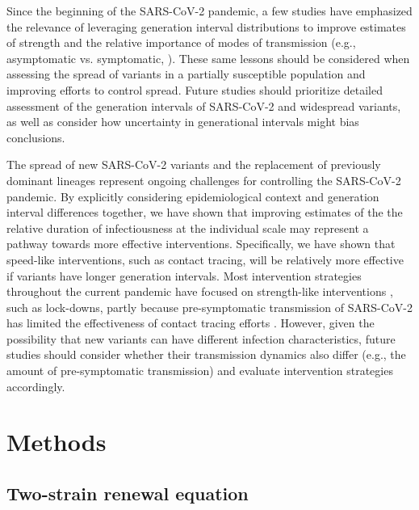 \documentclass[12pt]{article}
\begin{document}
Since the beginning of the SARS-CoV-2 pandemic, a few studies have emphasized the relevance of leveraging generation interval distributions to improve estimates of strength \citep{doi:10.1098/rsif.2020.0144,ali2020serial,gostic2020practical,park2021forward} and the relative importance of modes of transmission (e.g., asymptomatic vs. symptomatic, \cite{park2020time}).
These same lessons should be considered when assessing the spread of variants in a partially susceptible population and improving efforts to control spread.
Future studies should prioritize detailed assessment of the generation intervals of SARS-CoV-2 and widespread variants, as well as consider how uncertainty in generational intervals might bias conclusions.

The spread of new SARS-CoV-2 variants and the replacement of previously dominant lineages represent ongoing challenges for controlling the SARS-CoV-2 pandemic.  
By explicitly considering epidemiological context and generation interval differences together, we have shown that improving estimates of the the relative duration of infectiousness at the individual scale may represent a pathway towards more effective interventions. 
Specifically, we have shown that speed-like interventions, such as contact tracing, will be relatively more effective if variants have longer generation intervals.
Most intervention strategies throughout the current pandemic have focused on strength-like interventions \citep{flaxman2020Rt}, such as lock-downs, partly because pre-symptomatic transmission of SARS-CoV-2 has limited the effectiveness of contact tracing efforts \citep{hellewell2020feasibility}.
However, given the possibility that new variants can have different infection characteristics, future studies should consider whether their transmission dynamics also differ (e.g., the amount of pre-symptomatic transmission) and evaluate intervention strategies accordingly.

\section{Methods}

\subsection{Two-strain renewal equation}
\end{document}
